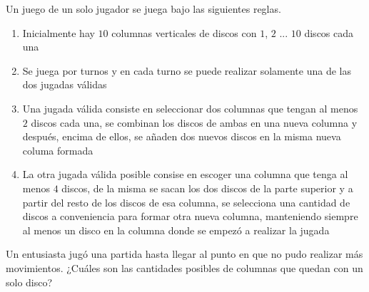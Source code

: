 \begin{problem}
	Un juego de un solo jugador se juega bajo las siguientes reglas. 
	\begin{enumerate}
		\item{Inicialmente hay $10$ columnas verticales de discos con $1$, $2$ ... $10$ discos cada una}
		\item{Se juega por turnos y en cada turno se puede realizar solamente una de las dos jugadas válidas}
		\item{Una jugada válida consiste en seleccionar dos columnas que tengan al menos $2$ discos cada una, se combinan los discos de ambas en una nueva columna y después, encima de ellos, se añaden dos nuevos discos en la misma nueva columa formada}
		\item{La otra jugada válida posible consise en escoger una columna que tenga al menos $4$ discos, de la misma se sacan los dos discos de la parte superior y a partir del resto de los discos de esa columna, se selecciona una cantidad de discos a conveniencia para formar otra nueva columna, manteniendo siempre al menos un disco en la columna donde se empezó a realizar la jugada}
	\end{enumerate}
	
	Un entusiasta jugó una partida hasta llegar al punto en que no pudo realizar más movimientos. ¿Cuáles son las cantidades posibles de columnas que quedan con un solo disco?
\end{problem}
